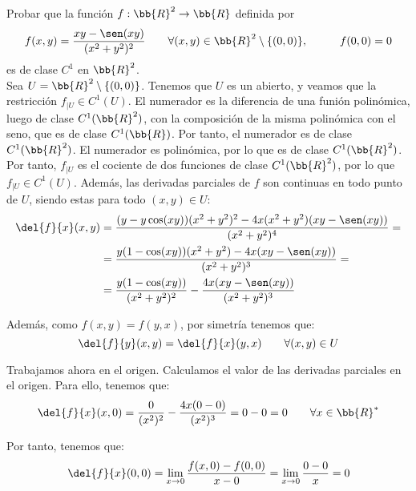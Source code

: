 \begin{ejercicio}
    Probar que la función $f: \bb{R}^2 \to \bb{R}$ definida por
    \begin{equation*}
        f(x,y) = \frac{xy-\sen(xy)}{(x^2+y^2)^2}
        \qquad \forall (x,y) \in \bb{R}^2\setminus\{(0,0)\}, \hspace{1cm}   f(0,0) = 0
    \end{equation*}
    es de clase $C^1$ en $\bb{R}^2$.\\

    Sea $U=\bb{R}^2\setminus \{(0,0)\}$.
    Tenemos que $U$ es un abierto, y veamos que la restricción $f_{\big| U}\in C^1({U})$.
    El numerador es la diferencia de una funión polinómica, luego de clase $C^1(\bb{R}^2)$, con la composición de la misma polinómica con el seno, que es de clase $C^1(\bb{R})$. Por tanto, el numerador es de clase $C^1(\bb{R}^2)$.
    El numerador es polinómica, por lo que es de clase $C^1(\bb{R}^2)$. Por tanto, $f_{\big| U}$ es el cociente de dos funciones de clase $C^1(\bb{R}^2)$, por lo que $f_{\big| U}\in C^1({U})$.
    Además, las derivadas parciales de $f$ son continuas en todo punto de $U$, siendo estas para todo $(x,y)\in U$:
    \begin{align*}
        \del{f}{x}(x,y) &= \frac{(y-y\cos(xy))(x^2+y^2)^2 - 4x(x^2+y^2)(xy-\sen(xy))}{(x^2+y^2)^4} =\\
        &= \frac{y(1-\cos(xy))(x^2+y^2) - 4x(xy-\sen(xy))}{(x^2+y^2)^3} =\\
        &= \frac{y(1-\cos(xy))}{(x^2+y^2)^2} - \frac{4x(xy-\sen(xy))}{(x^2+y^2)^3}
    \end{align*}

    Además, como $f(x,y)=f(y,x)$, por simetría tenemos que:
    \begin{equation*}
        \del{f}{y}(x,y) = \del{f}{x}(y,x) \qquad \forall (x,y)\in U
    \end{equation*}


    Trabajamos ahora en el origen. Calculamos el valor de las derivadas parciales en el origen. Para ello, tenemos que:
    \begin{equation*}
        \del{f}{x}(x,0) = \frac{0}{(x^2)^2} - \frac{4x(0-0)}{(x^2)^3} = 0-0=0 \qquad \forall x\in \bb{R}^\ast
    \end{equation*}

    Por tanto, tenemos que:
    \begin{equation*}
        \del{f}{x}(0,0) = \lim_{x\to 0} \frac{f(x,0)-f(0,0)}{x-0} = \lim_{x\to 0} \frac{0-0}{x} = 0
    \end{equation*}


\end{ejercicio}
